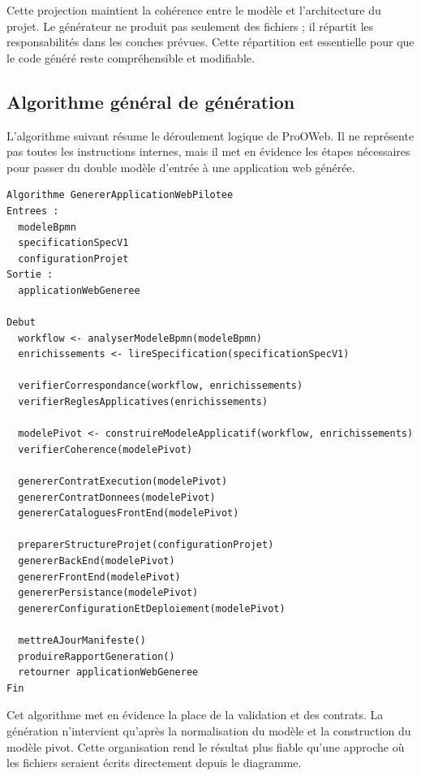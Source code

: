 Cette projection maintient la cohérence entre le modèle et l'architecture du projet. Le générateur ne produit pas seulement des fichiers ; il répartit les responsabilités dans les couches prévues. Cette répartition est essentielle pour que le code généré reste compréhensible et modifiable.

\subsection{Algorithme général de génération}

L'algorithme suivant résume le déroulement logique de ProOWeb. Il ne représente pas toutes les instructions internes, mais il met en évidence les étapes nécessaires pour passer du double modèle d'entrée à une application web générée.

\begin{lstlisting}[caption={Algorithme général de génération d'une application ProOWeb},label={lst:chap3-algorithme-generation}]
Algorithme GenererApplicationWebPilotee
Entrees :
  modeleBpmn
  specificationSpecV1
  configurationProjet
Sortie :
  applicationWebGeneree

Debut
  workflow <- analyserModeleBpmn(modeleBpmn)
  enrichissements <- lireSpecification(specificationSpecV1)

  verifierCorrespondance(workflow, enrichissements)
  verifierReglesApplicatives(enrichissements)

  modelePivot <- construireModeleApplicatif(workflow, enrichissements)
  verifierCoherence(modelePivot)

  genererContratExecution(modelePivot)
  genererContratDonnees(modelePivot)
  genererCataloguesFrontEnd(modelePivot)

  preparerStructureProjet(configurationProjet)
  genererBackEnd(modelePivot)
  genererFrontEnd(modelePivot)
  genererPersistance(modelePivot)
  genererConfigurationEtDeploiement(modelePivot)

  mettreAJourManifeste()
  produireRapportGeneration()
  retourner applicationWebGeneree
Fin
\end{lstlisting}

Cet algorithme met en évidence la place de la validation et des contrats. La génération n'intervient qu'après la normalisation du modèle et la construction du modèle pivot. Cette organisation rend le résultat plus fiable qu'une approche où les fichiers seraient écrits directement depuis le diagramme.

\label{sec:chap3-preservation}

